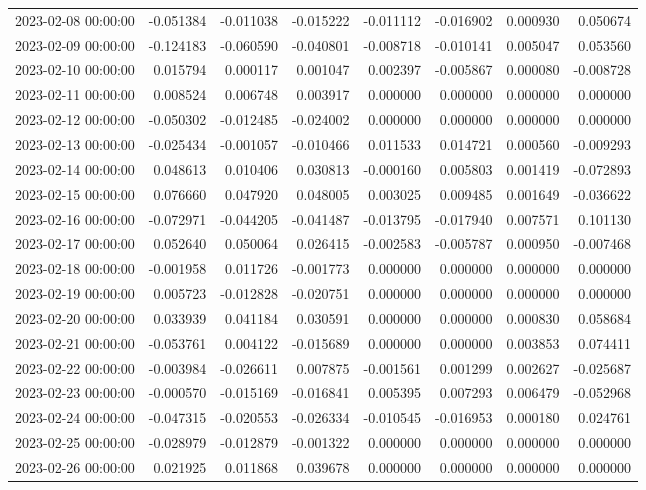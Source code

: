 \begin{tabular}{lrrrrrrr}
2023-02-08 00:00:00 & -0.051384 & -0.011038 & -0.015222 & -0.011112 & -0.016902 & 0.000930 & 0.050674 \\
2023-02-09 00:00:00 & -0.124183 & -0.060590 & -0.040801 & -0.008718 & -0.010141 & 0.005047 & 0.053560 \\
2023-02-10 00:00:00 & 0.015794 & 0.000117 & 0.001047 & 0.002397 & -0.005867 & 0.000080 & -0.008728 \\
2023-02-11 00:00:00 & 0.008524 & 0.006748 & 0.003917 & 0.000000 & 0.000000 & 0.000000 & 0.000000 \\
2023-02-12 00:00:00 & -0.050302 & -0.012485 & -0.024002 & 0.000000 & 0.000000 & 0.000000 & 0.000000 \\
2023-02-13 00:00:00 & -0.025434 & -0.001057 & -0.010466 & 0.011533 & 0.014721 & 0.000560 & -0.009293 \\
2023-02-14 00:00:00 & 0.048613 & 0.010406 & 0.030813 & -0.000160 & 0.005803 & 0.001419 & -0.072893 \\
2023-02-15 00:00:00 & 0.076660 & 0.047920 & 0.048005 & 0.003025 & 0.009485 & 0.001649 & -0.036622 \\
2023-02-16 00:00:00 & -0.072971 & -0.044205 & -0.041487 & -0.013795 & -0.017940 & 0.007571 & 0.101130 \\
2023-02-17 00:00:00 & 0.052640 & 0.050064 & 0.026415 & -0.002583 & -0.005787 & 0.000950 & -0.007468 \\
2023-02-18 00:00:00 & -0.001958 & 0.011726 & -0.001773 & 0.000000 & 0.000000 & 0.000000 & 0.000000 \\
2023-02-19 00:00:00 & 0.005723 & -0.012828 & -0.020751 & 0.000000 & 0.000000 & 0.000000 & 0.000000 \\
2023-02-20 00:00:00 & 0.033939 & 0.041184 & 0.030591 & 0.000000 & 0.000000 & 0.000830 & 0.058684 \\
2023-02-21 00:00:00 & -0.053761 & 0.004122 & -0.015689 & 0.000000 & 0.000000 & 0.003853 & 0.074411 \\
2023-02-22 00:00:00 & -0.003984 & -0.026611 & 0.007875 & -0.001561 & 0.001299 & 0.002627 & -0.025687 \\
2023-02-23 00:00:00 & -0.000570 & -0.015169 & -0.016841 & 0.005395 & 0.007293 & 0.006479 & -0.052968 \\
2023-02-24 00:00:00 & -0.047315 & -0.020553 & -0.026334 & -0.010545 & -0.016953 & 0.000180 & 0.024761 \\
2023-02-25 00:00:00 & -0.028979 & -0.012879 & -0.001322 & 0.000000 & 0.000000 & 0.000000 & 0.000000 \\
2023-02-26 00:00:00 & 0.021925 & 0.011868 & 0.039678 & 0.000000 & 0.000000 & 0.000000 & 0.000000 \\

\end{tabular}
